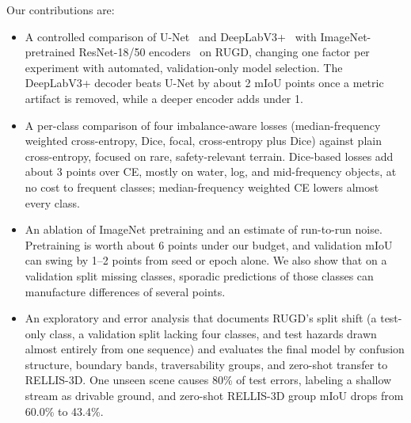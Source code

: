 Our contributions are:
\begin{itemize}
  \item A controlled comparison of U-Net~\cite{ronneberger2015unet} and
        DeepLabV3+~\cite{chen2018deeplabv3plus} with ImageNet-pretrained
        ResNet-18/50 encoders~\cite{he2016resnet} on RUGD, changing one factor
        per experiment with automated, validation-only model selection.
        The DeepLabV3+ decoder beats U-Net by about 2 mIoU points once a
        metric artifact is removed, while a deeper encoder adds under 1.
  \item A per-class comparison of four imbalance-aware losses (median-frequency
        weighted cross-entropy, Dice, focal, cross-entropy plus Dice) against
        plain cross-entropy, focused on rare, safety-relevant terrain.
        Dice-based losses add about 3 points over CE, mostly on water, log,
        and mid-frequency objects, at no cost to frequent classes;
        median-frequency weighted CE lowers almost every class.
  \item An ablation of ImageNet pretraining and an estimate of run-to-run
        noise. Pretraining is worth about 6 points under our budget, and
        validation mIoU can swing by 1--2 points from seed or epoch alone. We
        also show that on a validation split missing classes, sporadic
        predictions of those classes can manufacture differences of several
        points.
  \item An exploratory and error analysis that documents RUGD's split shift
        (a test-only class, a validation split lacking four classes, and test
        hazards drawn almost entirely from one sequence) and evaluates the
        final model by confusion structure, boundary bands, traversability
        groups, and zero-shot transfer to RELLIS-3D.
        One unseen scene causes 80\% of test errors, labeling a shallow
        stream as drivable ground, and zero-shot RELLIS-3D group mIoU drops
        from 60.0\% to 43.4\%.
\end{itemize}
